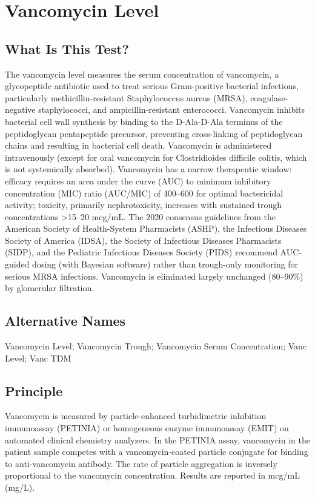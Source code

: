 \chapter{Vancomycin Level}

\section*{What Is This Test?}
The vancomycin level measures the serum concentration of vancomycin, a glycopeptide antibiotic used to treat serious Gram-positive bacterial infections, particularly methicillin-resistant Staphylococcus aureus (MRSA), coagulase-negative staphylococci, and ampicillin-resistant enterococci. Vancomycin inhibits bacterial cell wall synthesis by binding to the D-Ala-D-Ala terminus of the peptidoglycan pentapeptide precursor, preventing cross-linking of peptidoglycan chains and resulting in bacterial cell death. Vancomycin is administered intravenously (except for oral vancomycin for Clostridioides difficile colitis, which is not systemically absorbed). Vancomycin has a narrow therapeutic window: efficacy requires an area under the curve (AUC) to minimum inhibitory concentration (MIC) ratio (AUC/MIC) of 400--600 for optimal bactericidal activity; toxicity, primarily nephrotoxicity, increases with sustained trough concentrations >15--20 mcg/mL. The 2020 consensus guidelines from the American Society of Health-System Pharmacists (ASHP), the Infectious Diseases Society of America (IDSA), the Society of Infectious Diseases Pharmacists (SIDP), and the Pediatric Infectious Diseases Society (PIDS) recommend AUC-guided dosing (with Bayesian software) rather than trough-only monitoring for serious MRSA infections. Vancomycin is eliminated largely unchanged (80--90\%) by glomerular filtration.

\section*{Alternative Names}
Vancomycin Level; Vancomycin Trough; Vancomycin Serum Concentration; Vanc Level; Vanc TDM

\section*{Principle}
Vancomycin is measured by particle-enhanced turbidimetric inhibition immunoassay (PETINIA) or homogeneous enzyme immunoassay (EMIT) on automated clinical chemistry analyzers. In the PETINIA assay, vancomycin in the patient sample competes with a vancomycin-coated particle conjugate for binding to anti-vancomycin antibody. The rate of particle aggregation is inversely proportional to the vancomycin concentration. Results are reported in mcg/mL (mg/L).


